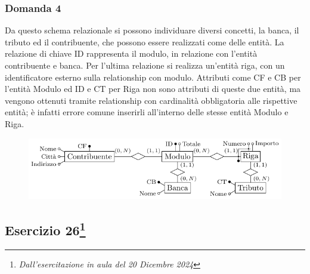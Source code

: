 \documentclass{article}
\begin{document}
\subsubsection*{Domanda 4}

Da questo schema relazionale si possono individuare diversi concetti, la banca, il tributo ed il contribuente, che possono essere realizzati come delle entità. La relazione di chiave ID rappresenta il modulo, in relazione con l'entità contribuente e banca. Per l'ultima relazione si realizza un'entità riga, con un identificatore esterno sulla relationship con modulo. Attributi come CF e CB per l'entità Modulo ed ID e CT per Riga non sono attributi di queste due entità, ma vengono ottenuti tramite relationship con cardinalità obbligatoria alle rispettive entità; è infatti errore comune inserirli all'interno delle stesse entità Modulo e Riga. 

\begin{figure}[H]%
    \centering%
    \includegraphics[scale=1.2]{schema_1_20-12-24.pdf}%
\end{figure}

\subsection{Esercizio 26\footnote{\textit{Dall'esercitazione in aula del 20 Dicembre 2024}}}
\end{document}
